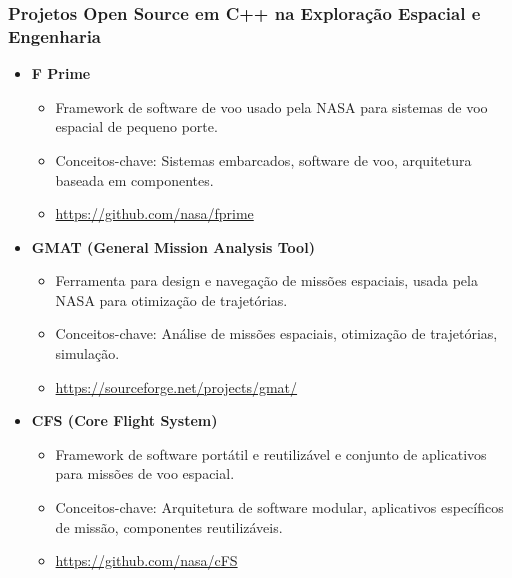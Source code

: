\documentclass[aspectratio=169]{beamer}
\begin{document}
\begin{frame}
    \frametitle{Projetos Open Source em C++ na Exploração Espacial e Engenharia}

    \begin{itemize}
        \item \textbf{F Prime}
        \begin{itemize}
            \item Framework de software de voo usado pela NASA para sistemas de voo espacial de pequeno porte.
            \item Conceitos-chave: Sistemas embarcados, software de voo, arquitetura baseada em componentes.
            \item  \url{https://github.com/nasa/fprime}
        \end{itemize}

        \item \textbf{GMAT (General Mission Analysis Tool)}
        \begin{itemize}
            \item Ferramenta para design e navegação de missões espaciais, usada pela NASA para otimização de trajetórias.
            \item Conceitos-chave: Análise de missões espaciais, otimização de trajetórias, simulação.
            \item  \url{https://sourceforge.net/projects/gmat/}
        \end{itemize}

        \item \textbf{CFS (Core Flight System)}
        \begin{itemize}
            \item Framework de software portátil e reutilizável e conjunto de aplicativos para missões de voo espacial.
            \item Conceitos-chave: Arquitetura de software modular, aplicativos específicos de missão, componentes reutilizáveis.
            \item  \url{https://github.com/nasa/cFS}
        \end{itemize}
    \end{itemize}
\end{frame}
\end{document}

